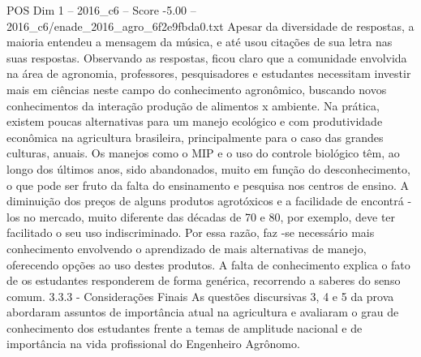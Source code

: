 \begin{textsample}{POS Dim 1 – 2016\_c6 – Score -5.00 – 2016\_c6/enade\_2016\_agro\_6f2e9fbda0.txt}
Apesar da diversidade de respostas, a maioria entendeu a mensagem da música, e até usou citações de sua letra nas suas respostas.
Observando as respostas, ficou claro que a comunidade envolvida na área de agronomia, professores, pesquisadores e estudantes necessitam investir mais em ciências neste campo do conhecimento agronômico, buscando novos conhecimentos da interação produção de alimentos x ambiente.
Na prática, existem poucas alternativas para um manejo ecológico e com produtividade econômica na agricultura brasileira, principalmente para o caso das grandes culturas, anuais.
Os manejos como o MIP e o uso do controle biológico têm, ao longo dos últimos anos, sido abandonados, muito em função do desconhecimento, o que pode ser fruto da falta do ensinamento e pesquisa nos centros de ensino.
A diminuição dos preços de alguns produtos agrotóxicos e a facilidade de encontrá -los no mercado, muito diferente das décadas de 70 e 80, por exemplo, deve ter facilitado o seu uso indiscriminado.
Por essa razão, faz -se necessário mais conhecimento envolvendo o aprendizado de mais alternativas de manejo, oferecendo opções ao uso destes produtos.
A falta de conhecimento explica o fato de os estudantes responderem de forma genérica, recorrendo a saberes do senso comum. 3.3.3 - Considerações Finais As questões discursivas 3, 4 e 5 da prova abordaram assuntos de importância atual na agricultura e avaliaram o grau de conhecimento dos estudantes frente a temas de amplitude nacional e de importância na vida profissional do Engenheiro Agrônomo.

\end{textsample}
